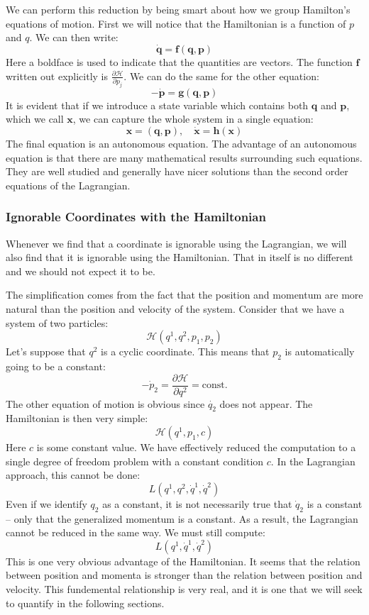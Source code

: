 We can perform this reduction by being smart about how we group Hamilton's equations of motion. First we will notice that the \gls{Hamiltonian} is a function of $p$ and $q$. We can then write:
$$\bm{\dot{q}}=\bm{f}(\bm{q},\bm{p})$$
Here a boldface is used to indicate that the quantities are vectors. The function $\bm{f}$ written out explicitly is $\frac{\partial \mathcal{H}}{\partial p_j}$. We can do the same for the other equation:
$$-\bm{\dot{p}}=\bm{g}(\bm{q},\bm{p})$$
It is evident that if we introduce a state variable which contains both $\bm{q}$ and $\bm{p}$, which we call $\bm{x}$, we can capture the whole system in a single equation:
$$\bm{x}=(\bm{q},\bm{p}),\quad \bm{\dot{x}}=\bm{h}(\bm{x})$$
The final equation is an autonomous equation. The advantage of an autonomous equation is that there are many mathematical results surrounding such equations. They are well studied and generally have nicer solutions than the second order equations of the \gls{Lagrangian}.

\subsubsection{Ignorable Coordinates with the Hamiltonian}
Whenever we find that a coordinate is ignorable using the \gls{Lagrangian}, we will also find that it is ignorable using the \gls{Hamiltonian}. That in itself is no different and we should not expect it to be. 

The simplification comes from the fact that the position and momentum are more natural than the position and velocity of the system. Consider that we have a system of two particles:
$$\mathcal{H}(q^1,q^2,p_1,p_2)$$
Let's suppose that $q^2$ is a cyclic coordinate. This means that $p_2$ is automatically going to be a constant:
$$-\dot{p}_2=\dfrac{\partial \mathcal{H}}{\partial q^2}=\text{const.}$$
The other equation of motion is obvious since $\dot{q_2}$ does not appear. The \gls{Hamiltonian} is then very simple:
$$\mathcal{H}(q^1,p_1,c)$$
Here $c$ is some constant value. We have effectively reduced the computation to a single degree of freedom problem with a constant condition $c$. In the \gls{Lagrangian} approach, this cannot be done:
$$L(q^1,q^2,\dot{q}^1,\dot{q}^2)$$
Even if we identify $q_2$ as a constant, it is not necessarily true that $\dot{q}_2$ is a constant -- only that the generalized momentum is a constant. As a result, the \gls{Lagrangian} cannot be reduced in the same way. We must still compute:
$$L(q^1,\dot{q}^1,\dot{q}^2)$$
This is one very obvious advantage of the \gls{Hamiltonian}. It seems that the relation between position and momenta is stronger than the relation between position and velocity. This fundemental relationship is very real, and it is one that we will seek to quantify in the following sections.

